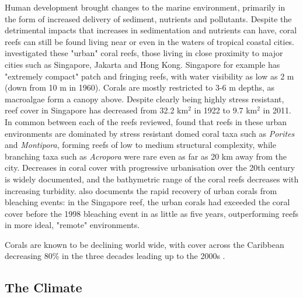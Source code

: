 \documentclass[11pt,a4paper]{article}
\begin{document}
Human development brought changes to the marine environment, primarily in the form of increased delivery of sediment, nutrients and pollutants.
 Despite the detrimental impacts that increases in sedimentation and nutrients can have, coral reefs can still be found living near or even in the waters of tropical coastal cities.
 \cite{Heery2018} investigated these "urban" coral reefs, those living in close proximity to major cities such as Singapore, Jakarta and Hong Kong.
 Singapore for example has "extremely compact" patch and fringing reefs, with water visibility as low as 2 m (down from 10 m in 1960).
 Corals are mostly restricted to 3-6 m depths, as macroalgae form a canopy above.
 Despite clearly being highly stress resistant, reef cover in Singapore has decreased from 32.2 km$^{2}$ in 1922 to 9.7 km$^{2}$ in 2011.
 In common between each of the reefs reviewed, \cite{Heery2018} found that reefs in these urban environments are dominated by stress resistant domed coral taxa such as \textit{Porites} and \textit{Montipora}, forming reefs of low to medium structural complexity, while branching taxa such as \textit{Acropora} were rare even as far as 20 km away from the city.
 Decreases in coral cover with progressive urbanisation over the 20th century is widely documented, and the bathymetric range of the coral reefs decreases with increasing turbidity.
 \cite{Heery2018} also documents the rapid recovery of urban corals from bleaching events: in the Singapore reef, the urban corals had exceeded the coral cover before the 1998 bleaching event in as little as five years, outperforming reefs in more ideal, "remote" environments. %

Corals are known to be declining world wide, with cover across the Caribbean decreasing 80\% in the three decades leading up to the 2000s \citep{Gardner2003}.


\subsection{The Climate}
\label{Present Climate}
\end{document}
